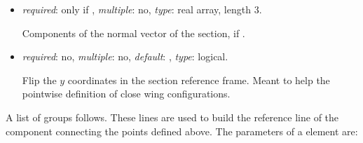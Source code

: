\begin{itemize}
\item {} \textit{required}: only if 
, \textit{multiple}: no, \textit{type}: real array, length 3.

    Components of the normal vector of the section, if .

\item {} \textit{required}: no, \textit{multiple}: no, 
\textit{default}:  , \textit{type}: logical.

  Flip the $y$ coordinates in the section reference frame. 
  Meant to help the pointwise definition of close wing configurations.

\end{itemize}
%
A list of  groups follows. These lines are used to build the 
reference line of the component connecting the points defined above. 
The parameters of a  element are:
